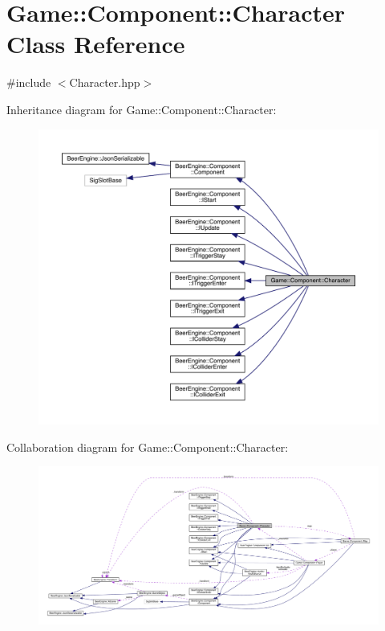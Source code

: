 \hypertarget{class_game_1_1_component_1_1_character}{}\section{Game\+:\+:Component\+:\+:Character Class Reference}
\label{class_game_1_1_component_1_1_character}


{\ttfamily \#include $<$Character.\+hpp$>$}



Inheritance diagram for Game\+:\+:Component\+:\+:Character\+:
\nopagebreak
\begin{figure}[H]
\begin{center}
\leavevmode
\includegraphics[width=350pt]{class_game_1_1_component_1_1_character__inherit__graph}
\end{center}
\end{figure}


Collaboration diagram for Game\+:\+:Component\+:\+:Character\+:
\nopagebreak
\begin{figure}[H]
\begin{center}
\leavevmode
\includegraphics[width=350pt]{class_game_1_1_component_1_1_character__coll__graph}
\end{center}
\end{figure}
